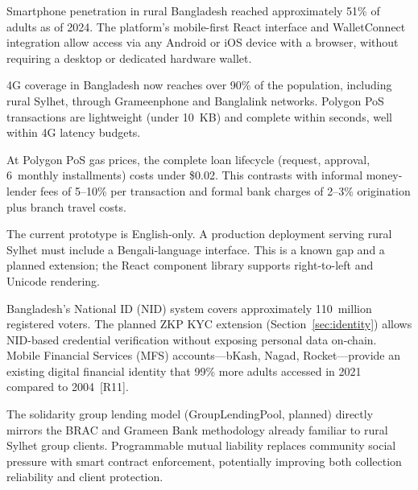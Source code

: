 \documentclass[12pt,a4paper]{report}
\begin{document}
\begin{description}[leftmargin=0pt]

\item[\textbf{1. Device access.}] Smartphone penetration in rural Bangladesh reached approximately 51\% of adults as of 2024. The platform's mobile-first React interface and WalletConnect integration allow access via any Android or iOS device with a browser, without requiring a desktop or dedicated hardware wallet.

\item[\textbf{2. Connectivity.}] 4G coverage in Bangladesh now reaches over 90\% of the population, including rural Sylhet, through Grameenphone and Banglalink networks. Polygon PoS transactions are lightweight (under 10~KB) and complete within seconds, well within 4G latency budgets.

\item[\textbf{3. Transaction cost.}] At Polygon PoS gas prices, the complete loan lifecycle (request, approval, 6~monthly installments) costs under \$0.02. This contrasts with informal money-lender fees of 5--10\% per transaction and formal bank charges of 2--3\% origination plus branch travel costs.

\item[\textbf{4. Language and literacy.}] The current prototype is English-only. A production deployment serving rural Sylhet must include a Bengali-language interface. This is a known gap and a planned extension; the React component library supports right-to-left and Unicode rendering.

\item[\textbf{5. Identity and onboarding.}] Bangladesh's National ID (NID) system covers approximately 110~million registered voters. The planned ZKP KYC extension (Section~\ref{sec:identity}) allows NID-based credential verification without exposing personal data on-chain. Mobile Financial Services (MFS) accounts---bKash, Nagad, Rocket---provide an existing digital financial identity that 99\% more adults accessed in 2021 compared to 2004~[R11].

\item[\textbf{6. Group lending fit.}] The solidarity group lending model (GroupLendingPool, planned) directly mirrors the BRAC and Grameen Bank methodology already familiar to rural Sylhet group clients. Programmable mutual liability replaces community social pressure with smart contract enforcement, potentially improving both collection reliability and client protection.

\end{description}
\end{document}
